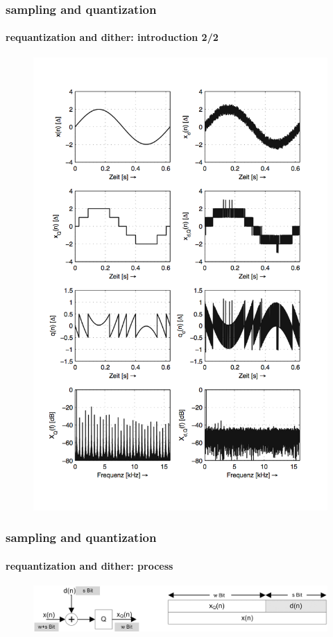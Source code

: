 	\begin{frame}\frametitle{sampling and quantization}\framesubtitle{requantization and dither: introduction 2/2}
		\vspace{-5mm}
        \begin{figure}
			\centering
				\includegraphics[scale=0.4]{Graph/3stepquantdither.png}
		\end{figure}
	\end{frame}	
	\begin{frame}\frametitle{sampling and quantization}\framesubtitle{requantization and dither: process}
		\begin{figure}
			\centering
				\includegraphics[scale=0.9]{Graph/quantisierung_mit_dither.png}
		\end{figure}
	\end{frame}	
